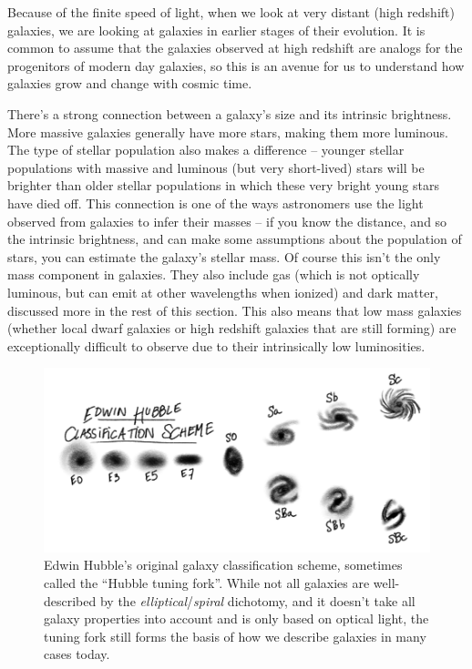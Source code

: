 Because of the finite speed of light, when we look at very distant (high redshift) galaxies, we are looking at galaxies in earlier stages of their evolution. It is common to assume that the galaxies observed at high redshift are analogs for the progenitors of modern day galaxies, so this is an avenue for us to understand how galaxies grow and change with cosmic time.

There's a strong connection between a galaxy's size and its intrinsic brightness. More massive galaxies generally have more stars, making them more luminous. The type of stellar population also makes a difference -- younger stellar populations with massive and luminous (but very short-lived) stars will be brighter than older stellar populations in which these very bright young stars have died off. This connection is one of the ways astronomers use the light observed from galaxies to infer their masses -- if you know the distance, and so the intrinsic brightness, and can make some assumptions about the population of stars, you can estimate the galaxy's stellar mass. Of course this isn't the only mass component in galaxies. They also include gas (which is not optically luminous, but can emit at other wavelengths when ionized) and dark matter, discussed more in the rest of this section. This also means that low mass galaxies (whether local dwarf galaxies or high redshift galaxies that are still forming) are exceptionally difficult to observe due to their intrinsically low luminosities.

\begin{figure}
    \centering
    \includegraphics[width=0.8\linewidth]{img/galaxyclass.png}
    \caption{Edwin Hubble's original galaxy classification scheme, sometimes called the ``Hubble tuning fork''. While not all galaxies are well-described by the \textit{elliptical}/\textit{spiral} dichotomy, and it doesn't take all galaxy properties into account and is only based on optical light, the tuning fork still forms the basis of how we describe galaxies in many cases today.}
    \label{fig:galaxyclass}
\end{figure}

